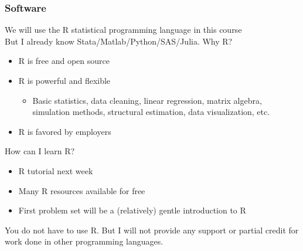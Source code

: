 \documentclass{beamer}
\begin{document}

\begin{frame}\frametitle{Software}
    We will use the R statistical programming language in this course \\
    \vspace{2ex}
    But I already know Stata/Matlab/Python/SAS/Julia. Why R?
    \begin{itemize}
        \item R is free and open source
        \item R is powerful and flexible
        \begin{itemize}
            \item Basic statistics, data cleaning, linear regression, matrix algebra, simulation methods, structural estimation, data visualization, etc.
        \end{itemize}
        \item R is favored by employers
    \end{itemize}
    \vspace{2ex}
    How can I learn R?
    \begin{itemize}
        \item R tutorial next week
        \item Many R resources available for free
        \item First problem set will be a (relatively) gentle introduction to R
    \end{itemize}
    \vspace{2ex}
    You do not have to use R. But I will not provide any support or partial credit for work done in other programming languages.
\end{frame}
\end{document}
